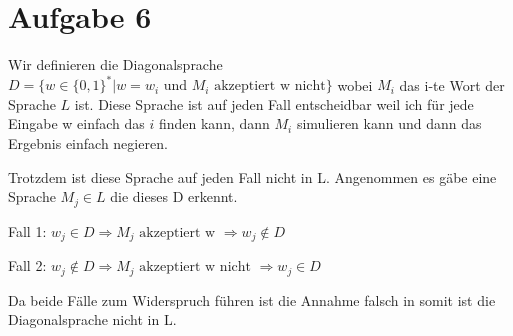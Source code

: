 \documentclass[a4paper,11pt]{scrartcl}
\begin{document}
	
	\section*{Aufgabe 6}
		Wir definieren die Diagonalsprache $D = \{w \in \{0, 1\}^* \vert w = w_i \text{ und } M_i \text{ akzeptiert w nicht}\}$ wobei  $M_i$ das i-te Wort der Sprache $L$ ist.
		Diese Sprache ist auf jeden Fall entscheidbar weil ich für jede Eingabe w einfach das $i$ finden kann, dann $M_i$ simulieren kann und dann das Ergebnis einfach negieren.

		Trotzdem ist diese Sprache auf jeden Fall nicht in L.
		Angenommen es gäbe eine Sprache $M_j \in L$ die dieses D erkennt.
		
		Fall 1: $w_j \in D \Rightarrow M_j \text{ akzeptiert w } \Rightarrow w_j \not\in D$

		Fall 2: $w_j \not\in D \Rightarrow M_j \text{ akzeptiert w nicht } \Rightarrow w_j \in D$

		Da beide Fälle zum Widerspruch führen ist die Annahme falsch in somit ist die Diagonalsprache nicht in L.
	
\end{document}
